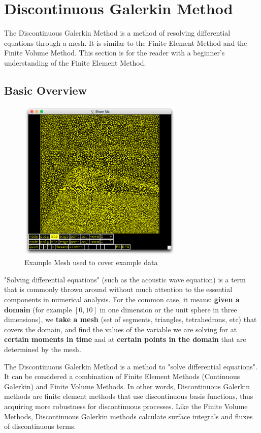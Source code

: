 \newpage
\section{Discontinuous Galerkin Method}

The Discontinuous Galerkin Method is a method of resolving differential equations through a mesh. It is similar to the Finite Element Method and the Finite Volume Method. This section is for the reader with a beginner's understanding of the Finite Element Method.

\subsection{Basic Overview}


\begin{figure}[ht]
\centering
\includegraphics[width=0.7\textwidth]{Images/Example-Mesh.png}
\caption{Example Mesh used to cover example data}
\label{fig:couches5-mesh}
\end{figure}

"Solving differential equations" (such as the acoustic wave equation) is a term that is commonly thrown around without much attention to the essential components in numerical analysis. For the common case, it means: \textbf{given a domain} (for example $[0,10]$ in one dimension or the unit sphere in three dimensions), we \textbf{take a mesh} (set of segments, triangles, tetrahedrons, etc) that covers the domain, and find the values of the variable we are solving for at \textbf{certain moments in time} and at \textbf{certain points in the domain} that are determined by the mesh.

The Discontinuous Galerkin Method is a method to "solve differential equations". It can be considered a combination of Finite Element Methods (Continuous Galerkin) and Finite Volume Methods. In other words, Discontinuous Galerkin methods are finite element methods that use discontinuous basis functions, thus acquiring more robustness for discontinuous processes. Like the Finite Volume Methods, Discontinuous Galerkin methods calculate surface integrals and fluxes of discontinuous terms.

